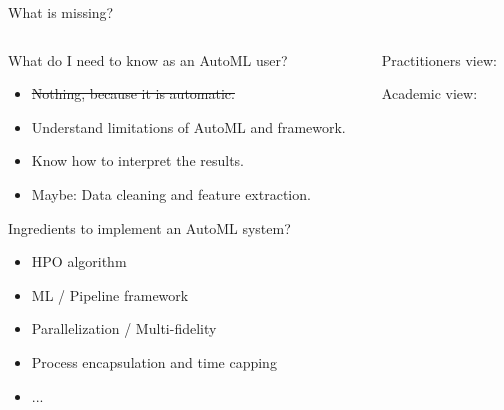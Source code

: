 \begin{frame}{What is missing?}
  \begin{columns}
    \begin{column}{0.5\textwidth}
        What do I need to know as an AutoML user?
        \begin{itemize}
          \item \sout{Nothing, because it is automatic.}
          \item Understand limitations of AutoML and framework.
          \item Know how to interpret the results.
          \item Maybe: Data cleaning and feature extraction.
        \end{itemize}

        \vspace{1em}

        Ingredients to implement an AutoML system?
        \begin{itemize}
          \item HPO algorithm
          \item ML / Pipeline framework 
          \item Parallelization / Multi-fidelity
          \item Process encapsulation and time capping 
          \item ...
        \end{itemize}
    \end{column}%
    \begin{column}{0.5\textwidth}
      \begin{center}

        Practitioners view:
        \scalebox{0.45}{
          
        }
        \vspace{1em}

        Academic view:
        \scalebox{0.45}{
          
        }

      \end{center}
    \end{column}
  \end{columns}
\end{frame}




